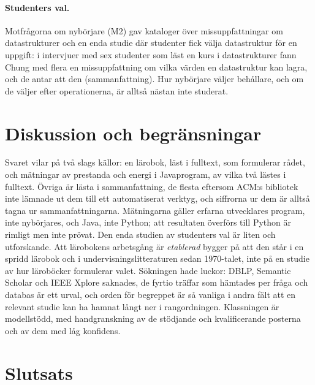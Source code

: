 \paragraph{Studenters val.}  Motfrågorna om nybörjare (M2) gav
kataloger över missuppfattningar om datastrukturer och en enda studie
där studenter fick välja datastruktur för en uppgift: i intervjuer med
sex studenter som läst en kurs i datastrukturer fann Chung med flera en
missuppfattning om vilka värden en datastruktur kan lagra, och de antar
att den 
(sammanfattning).  Hur nybörjare väljer behållare, och om de väljer
efter operationerna, är alltså nästan inte studerat.

\section{Diskussion och begränsningar}
\label{sec:vb-diskussion}

Svaret vilar på två slags källor: en lärobok, läst i fulltext, som
formulerar rådet, och mätningar av prestanda och energi i
Javaprogram, av vilka två lästes i fulltext.  Övriga är lästa i
sammanfattning, de flesta eftersom ACM:s bibliotek inte lämnade ut dem
till ett automatiserat verktyg, och siffrorna ur dem är alltså tagna ur
sammanfattningarna.  Mätningarna
gäller erfarna utvecklares program, inte nybörjares, och Java, inte
Python; att resultaten överförs till Python är rimligt men inte prövat.
Den enda studien av studenters val är liten och utforskande.
Att lärobokens arbetsgång är \emph{etablerad} bygger på att den står i
en spridd lärobok och i undervisningslitteraturen sedan 1970-talet, inte
på en studie av hur läroböcker formulerar valet.  Sökningen hade
luckor: DBLP, Semantic Scholar och IEEE Xplore saknades, de fyrtio
träffar som hämtades per fråga och databas är ett urval, och orden för
begreppet är så vanliga i andra fält att en relevant studie kan ha
hamnat långt ner i rangordningen.  Klassningen är modellstödd, med
handgranskning av de stödjande och kvalificerande posterna och av dem
med låg konfidens.

\section{Slutsats}
\label{sec:vb-slutsats}

